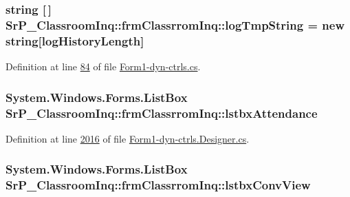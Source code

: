 \hypertarget{class_sr_p___classroom_inq_1_1frm_classrrom_inq_acf11c4997f1ad160ca28e4d7b1489f08}{
\subsubsection[{log\-Tmp\-String}]{\setlength{\rightskip}{0pt plus 5cm}string \mbox{[}$\,$\mbox{]} {\bf \-Sr\-P\-\_\-\-Classroom\-Inq\-::frm\-Classrrom\-Inq\-::log\-Tmp\-String} = new string\mbox{[}{\bf log\-History\-Length}\mbox{]}}}
\label{class_sr_p___classroom_inq_1_1frm_classrrom_inq_acf11c4997f1ad160ca28e4d7b1489f08}


\-Definition at line \hyperlink{_form1-dyn-ctrls_8cs_source_l00084}{84} of file \hyperlink{_form1-dyn-ctrls_8cs_source}{\-Form1-\/dyn-\/ctrls.\-cs}.

\hypertarget{class_sr_p___classroom_inq_1_1frm_classrrom_inq_ac10f995b70bc21201309a93e18466bcd}{
\subsubsection[{lstbx\-Attendance}]{\setlength{\rightskip}{0pt plus 5cm}\-System.\-Windows.\-Forms.\-List\-Box {\bf \-Sr\-P\-\_\-\-Classroom\-Inq\-::frm\-Classrrom\-Inq\-::lstbx\-Attendance}}}
\label{class_sr_p___classroom_inq_1_1frm_classrrom_inq_ac10f995b70bc21201309a93e18466bcd}


\-Definition at line \hyperlink{_form1-dyn-ctrls_8_designer_8cs_source_l02016}{2016} of file \hyperlink{_form1-dyn-ctrls_8_designer_8cs_source}{\-Form1-\/dyn-\/ctrls.\-Designer.\-cs}.

\hypertarget{class_sr_p___classroom_inq_1_1frm_classrrom_inq_aa78736e6fefabc449eb2ac37ce4f5f60}{
\subsubsection[{lstbx\-Conv\-View}]{\setlength{\rightskip}{0pt plus 5cm}\-System.\-Windows.\-Forms.\-List\-Box {\bf \-Sr\-P\-\_\-\-Classroom\-Inq\-::frm\-Classrrom\-Inq\-::lstbx\-Conv\-View}}}
\label{class_sr_p___classroom_inq_1_1frm_classrrom_inq_aa78736e6fefabc449eb2ac37ce4f5f60}



